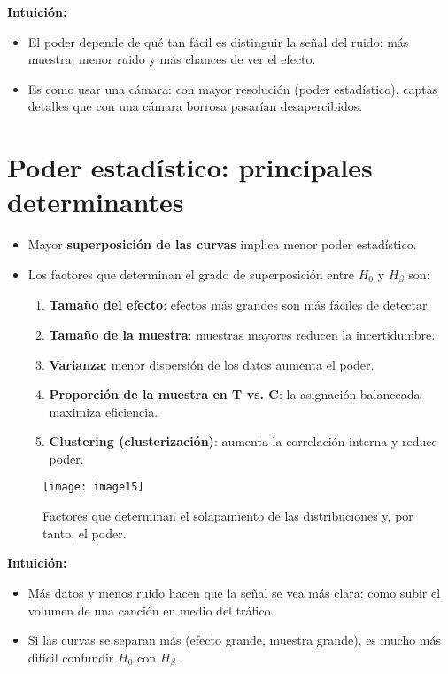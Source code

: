 \documentclass[12pt]{article}
\begin{document}
\textbf{Intuición:}
\begin{itemize}
    \item El poder depende de qué tan fácil es distinguir la señal del ruido: más muestra, menor ruido y más chances de ver el efecto.
    \item Es como usar una cámara: con mayor resolución (poder estadístico), captas detalles que con una cámara borrosa pasarían desapercibidos.
\end{itemize}


\section*{\noindent\textbf{Poder estadístico: principales determinantes}}

\begin{itemize}
    \item Mayor \textbf{superposición de las curvas} implica menor poder estadístico.
    \item Los factores que determinan el grado de superposición entre $H_0$ y $H_\beta$ son:
    \begin{enumerate}
        \item \textbf{Tamaño del efecto}: efectos más grandes son más fáciles de detectar.
        \item \textbf{Tamaño de la muestra}: muestras mayores reducen la incertidumbre.
        \item \textbf{Varianza}: menor dispersión de los datos aumenta el poder.
        \item \textbf{Proporción de la muestra en T vs. C}: la asignación balanceada maximiza eficiencia.
        \item \textbf{Clustering (clusterización)}: aumenta la correlación interna y reduce poder.
    \end{enumerate}
\end{itemize}

\begin{figure}[H]
    \centering
    \texttt{[image: image15]}
    \caption{\footnotesize Factores que determinan el solapamiento de las distribuciones y, por tanto, el poder.}
\end{figure}

\textbf{Intuición:}
\begin{itemize}
    \item Más datos y menos ruido hacen que la señal se vea más clara: como subir el volumen de una canción en medio del tráfico.
    \item Si las curvas se separan más (efecto grande, muestra grande), es mucho más difícil confundir $H_0$ con $H_\beta$.
\end{itemize}
\end{document}
